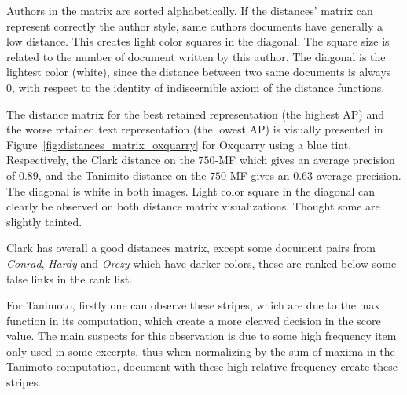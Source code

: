 Authors in the matrix are sorted alphabetically.
If the distances' matrix can represent correctly the author style, same authors documents have generally a low distance.
This creates light color squares in the diagonal.
The square size is related to the number of document written by this author.
The diagonal is the lightest color (white), since the distance between two same documents is always 0, with respect to the identity of indiscernible axiom of the distance functions.

The distance matrix for the best retained representation (the highest AP) and the worse retained text representation (the lowest AP) is visually presented in Figure~\ref{fig:distances_matrix_oxquarry} for Oxquarry using a blue tint.
Respectively, the Clark distance on the $750$-MF which gives an average precision of $0.89$, and the Tanimito distance on the $750$-MF gives an $0.63$ average precision.
The diagonal is white in both images.
Light color square in the diagonal can clearly be observed on both distance matrix visualizations.
Thought some are slightly tainted.

Clark has overall a good distances matrix, except some document pairs from \textit{Conrad}, \textit{Hardy} and \textit{Orczy} which have darker colors, these are ranked below some false links in the rank list.

For Tanimoto, firstly one can observe these stripes, which are due to the max function in its computation, which create a more cleaved decision in the score value.
The main suspects for this observation is due to some high frequency item only used in some excerpts, thus when normalizing by the sum of maxima in the Tanimoto computation, document with these high relative frequency create these stripes.

